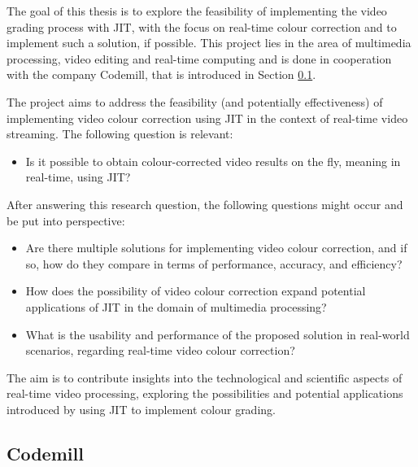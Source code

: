 \documentclass[12pt,a4paper]{article}
\begin{document}
The goal of this thesis is to explore the feasibility of implementing the video grading process with JIT, with the focus on real-time colour correction and to implement such a solution, if possible. This project lies in the area of multimedia processing, video editing and real-time computing and is done in cooperation with the company Codemill, that is introduced in Section \ref{subsection:codemill}.



The project aims to address the feasibility (and potentially effectiveness) of implementing video colour correction using JIT in the context of real-time video streaming. The following question is relevant:

\begin{itemize}
	\item Is it possible to obtain colour-corrected video results on the fly, meaning in real-time, using JIT?
\end{itemize}

After answering this research question, the following questions might occur and be put into perspective:

\begin{itemize}
	\item Are there multiple solutions for implementing video colour correction, and if so, how do they compare in terms of performance, accuracy, and efficiency?
	\item How does the possibility of video colour correction expand potential applications of JIT in the domain of multimedia processing?
	\item What is the usability and performance of the proposed solution in real-world scenarios, regarding real-time video colour correction?
\end{itemize}

The aim is to contribute insights into the technological and scientific aspects of real-time video processing, exploring the possibilities and potential applications introduced by using JIT to implement colour grading. 







\subsection{Codemill} \label{subsection:codemill}
\end{document}
